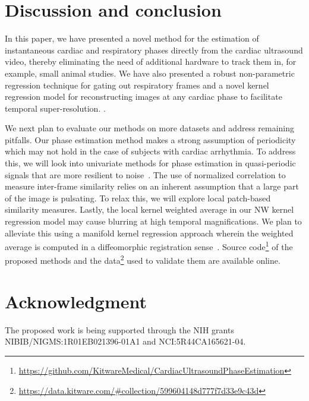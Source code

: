 \documentclass[journal]{IEEEtran}
\newcommand{\rk}[1]{{\color{red}{#1}}}
\begin{document}
\section{Discussion and conclusion}
\label{sec:conclusion}
%
In this paper, we have presented a novel method for the estimation of instantaneous cardiac and respiratory phases directly from the cardiac ultrasound video, thereby eliminating the need of additional hardware to track them in, for example, small animal studies. We have also presented a robust non-parametric regression technique for gating out respiratory frames and a novel kernel regression model for reconstructing images at any cardiac phase to facilitate temporal super-resolution. \rk{Note that the proposed phase estimation method is designed to be applied retrospectively after the ultrasound video is acquired and, hence, cannot be used in applications where live estimation of phase is required}.

We next plan to evaluate our methods on more datasets and address remaining pitfalls. Our phase estimation method makes a strong assumption of periodicity which may not hold in the case of subjects with cardiac arrhythmia. To address this, we will look into univariate methods for phase estimation in quasi-periodic signals that are more resilient to noise~\cite{Luo2003,Lu2013,Kurz2015}. The use of normalized correlation to measure inter-frame similarity relies on an inherent assumption that a large part of the image is pulsating. To relax this, we will explore local patch-based similarity measures. Lastly, the local kernel weighted average in our NW kernel regression model may cause blurring at high temporal magnifications. We plan to alleviate this using a manifold kernel regression approach wherein the weighted average is computed in a diffeomorphic registration sense~\cite{Davis2010}. Source code\footnote{\url{https://github.com/KitwareMedical/CardiacUltrasoundPhaseEstimation}} of the proposed methods and the data\footnote{\url{https://data.kitware.com/\#collection/599604148d777f7d33e9c43d}} used to validate them are available online.
%
%
\section*{Acknowledgment}
The proposed work is being supported through the NIH grants NIBIB/NIGMS:1R01EB021396-01A1 and NCI:5R44CA165621-04. 
%


%
\end{document}
